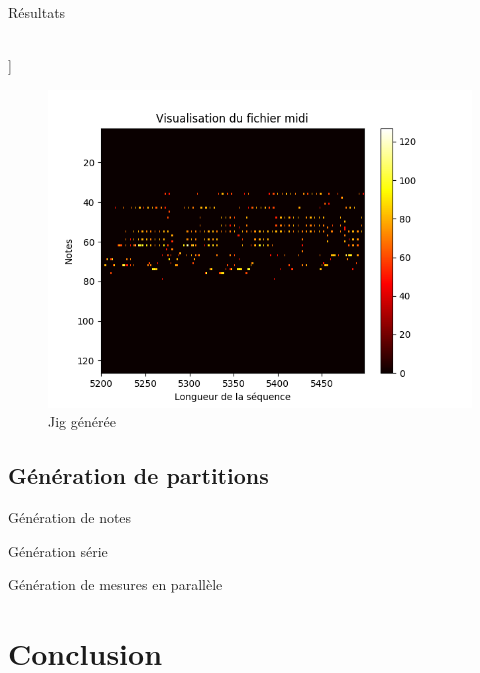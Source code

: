 \documentclass{beamer}
\begin{document}
\begin{frame}{Résultats}

\begin{minipage}{0.5\linewidth}
\begin{center}
\\
\mediabutton[
mediacommand=song_jig:play[(811)]	
]{}
\end{center}
\end{minipage}\hfill
\begin{minipage}{0.5\linewidth}
\begin{figure}
\begin{center}
\includegraphics[width=\linewidth]{images/jig_generated_38800.png}
\caption{Jig générée}
\end{center}
\end{figure}
\end{minipage}
\end{frame}

\subsection{Génération de partitions}

\begin{frame}{Génération de notes}

\end{frame}

\begin{frame}{Génération série}

\end{frame}

\begin{frame}{Génération de mesures en parallèle}

\end{frame}

\section{Conclusion}
\end{document}
